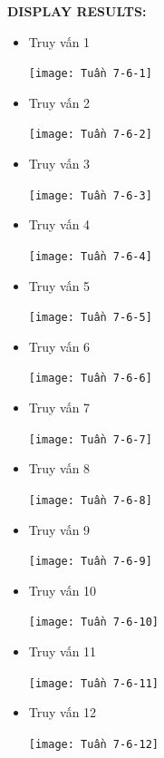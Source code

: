 \documentclass[12pt,a4paper]{report}
\begin{document}
	{\bf DISPLAY RESULTS:}
		\begin{itemize}
			\item Truy vấn 1
				\begin{center}
					\texttt{[image: Tuần 7-6-1]}
				\end{center}
			\item Truy vấn 2
				\begin{center}
					\texttt{[image: Tuần 7-6-2]}
				\end{center}
			\item Truy vấn 3
				\begin{center}
					\texttt{[image: Tuần 7-6-3]}
				\end{center}
			\item Truy vấn 4
				\begin{center}
					\texttt{[image: Tuần 7-6-4]}
				\end{center}
			\item Truy vấn 5
				\begin{center}
					\texttt{[image: Tuần 7-6-5]}
				\end{center}
			\item Truy vấn 6
				\begin{center}
					\texttt{[image: Tuần 7-6-6]}
				\end{center}
			\item Truy vấn 7
				\begin{center}
					\texttt{[image: Tuần 7-6-7]}
				\end{center}
			\item Truy vấn 8
				\begin{center}
					\texttt{[image: Tuần 7-6-8]}
				\end{center}
			\item Truy vấn 9
				\begin{center}
					\texttt{[image: Tuần 7-6-9]}
				\end{center}
			\item Truy vấn 10
				\begin{center}
					\texttt{[image: Tuần 7-6-10]}
				\end{center}
			\item Truy vấn 11
				\begin{center}
					\texttt{[image: Tuần 7-6-11]}
				\end{center}
			\item Truy vấn 12
				\begin{center}
					\texttt{[image: Tuần 7-6-12]}
				\end{center}
		\end{itemize}
\end{document}
